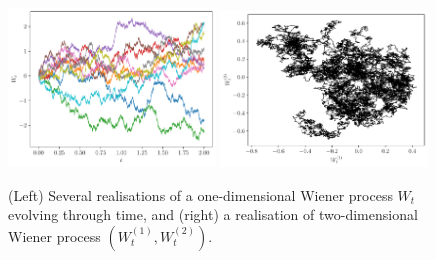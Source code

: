 \begin{figure}
	\begin{center}
		\includegraphics[width=0.49\textwidth]{chp02_background/figures/wiener_realisations_1d.pdf}
		\includegraphics[width=0.49\textwidth]{chp02_background/figures/wiener_realisations_2d.pdf}
		\caption{(Left) Several realisations of a one-dimensional Wiener process \(W_t\) evolving through time, and (right) a realisation of two-dimensional Wiener process \(\left(W_t^{(1)}, W_t^{(2)}\right)\).}
		\label{fig:wiener_rels}
	\end{center}
\end{figure}


